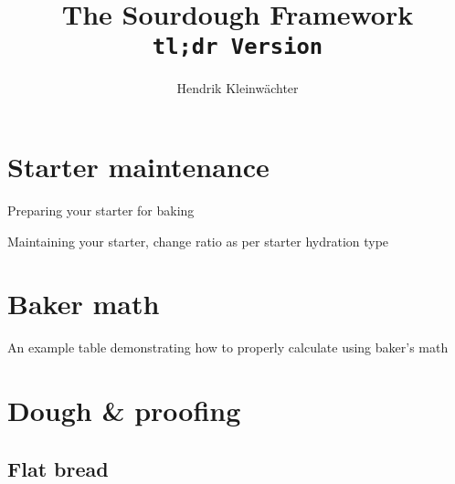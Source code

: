 \documentclass[paper=a4, twoside=false, fontsize=12pt]{scrbook}
\author{Hendrik Kleinwächter}
\title{The Sourdough Framework\\\texttt{tl;dr Version}}
\begin{document}
\maketitle

\section*{Starter maintenance}
\begin{flowchart}[!htb]

\caption*{Preparing your starter for baking}
\end{flowchart}

\begin{flowchart}[!htb]

\caption*{Maintaining your starter, change ratio as per starter hydration type}
\end{flowchart}

\clearpage{}
\section*{Baker math}
\begin{table}[!htb]
  
  \caption*{An example table demonstrating how to properly calculate using
  baker's math}
\end{table}

\section*{Dough \& proofing}
\subsection*{Flat bread}

\clearpage{}
\end{document}
